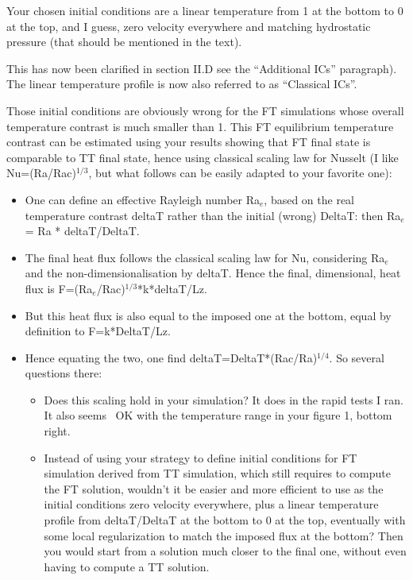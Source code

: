 \documentclass[aps, 11pt, singlecolumn]{revtex4-1} %
\begin{document}
\begin{singlespace}
\begin{myquotation}
Your chosen initial conditions are a linear temperature from 1 at the bottom to 0 at the top, and I guess, zero velocity everywhere and matching hydrostatic pressure (that should be mentioned in the text). 
\end{myquotation}
This has now been clarified in section II.D see the ``Additional ICs'' paragraph).
The linear temperature profile is now also referred to as ``Classical ICs''.

\begin{myquotation}
Those initial conditions are obviously wrong for the FT simulations whose overall temperature contrast is much smaller than 1. 
This FT equilibrium temperature contrast can be estimated using your results showing that FT final state is comparable to TT final state, hence using classical scaling law for Nusselt (I like Nu=(Ra/Rac)$^{1/3}$, but what follows can be easily adapted to your favorite one):
\begin{itemize}
\item One can define an effective Rayleigh number Ra$_e$, based on the real temperature contrast deltaT rather than the initial (wrong) DeltaT: then Ra$_e$ = Ra * deltaT/DeltaT.
\item The final heat flux follows the classical scaling law for Nu, considering Ra$_e$ and the non-dimensionalisation by deltaT. 
Hence the final, dimensional, heat flux is F=(Ra$_e$/Rac)$^{1/3}$*k*deltaT/Lz.
\item But this heat flux is also equal to the imposed one at the bottom, equal by definition to F=k*DeltaT/Lz.
\item Hence equating the two, one find deltaT=DeltaT*(Rac/Ra)$^{1/4}$. So several questions there: 
\begin{itemize}
	\item Does this scaling hold in your simulation? It does in the rapid tests I ran. It also seems ~OK with the temperature range in your figure 1, bottom right.
	\item Instead of using your strategy to define initial conditions for FT simulation derived from TT simulation, which still requires to compute the FT solution, wouldn’t it be easier and more efficient to use as the initial conditions zero velocity everywhere, plus a linear temperature profile from deltaT/DeltaT at the bottom to 0 at the top, eventually with some local regularization to match the imposed flux at the bottom? 
	Then you would start from a solution much closer to the final one, without even having to compute a TT solution.

\end{itemize}
\end{itemize}
\end{myquotation}
\end{singlespace}
\end{document}
